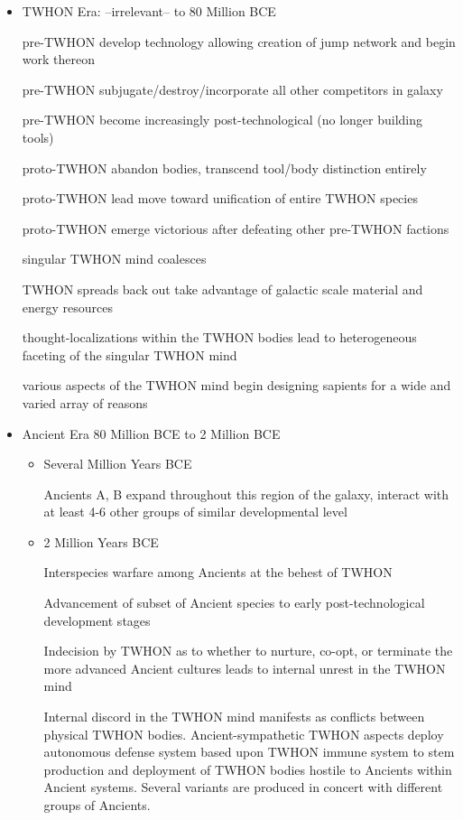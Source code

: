 \begin{itemize}
\item TWHON Era: --irrelevant-- to 80 Million BCE

pre-TWHON develop technology allowing creation of jump network and
begin work thereon

pre-TWHON subjugate/destroy/incorporate all other competitors in
galaxy

pre-TWHON become increasingly post-technological (no longer building
tools)

proto-TWHON abandon bodies, transcend tool/body distinction entirely

proto-TWHON lead move toward unification of entire TWHON species

proto-TWHON emerge victorious after defeating other pre-TWHON factions

singular TWHON mind coalesces

TWHON spreads back out take advantage of galactic scale material and
energy resources

thought-localizations within the TWHON bodies lead to heterogeneous
faceting of the singular TWHON mind

various aspects of the TWHON mind begin designing sapients for a wide
and varied array of reasons

\item Ancient Era 80 Million BCE to 2 Million BCE
\begin{itemize}
\item	Several Million Years BCE 

Ancients A, B expand throughout this region of the galaxy, interact
with at least 4-6 other groups of similar developmental level

\item 2 Million Years BCE 

Interspecies warfare among Ancients at the behest of TWHON

Advancement of subset of Ancient species to early post-technological
development stages

Indecision by TWHON as to whether to nurture, co-opt, or terminate the
more advanced Ancient cultures leads to internal unrest in the TWHON
mind

Internal discord in the TWHON mind manifests as conflicts between
physical TWHON bodies. Ancient-sympathetic TWHON aspects deploy
autonomous defense system based upon TWHON immune system to stem
production and deployment of TWHON bodies hostile to Ancients within
Ancient systems. Several variants are produced in concert with
different groups of Ancients.


\end{itemize}
\end{itemize}
